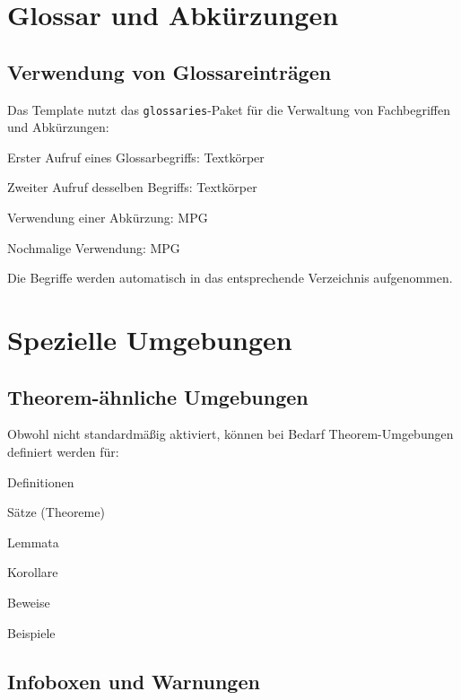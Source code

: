 \section{Glossar und Abkürzungen}
\label{sec:glossar_demo}

\subsection{Verwendung von Glossareinträgen}
\label{subsec:glossar_verwendung}

Das Template nutzt das \texttt{glossaries}-Paket für die Verwaltung von Fachbegriffen und Abkürzungen:
\begin{listenabsatz}
	\item Erster Aufruf eines Glossarbegriffs: \gls{Textkörper}
	\item Zweiter Aufruf desselben Begriffs: \gls{Textkörper}
	\item Verwendung einer Abkürzung: \gls{MPG}
	\item Nochmalige Verwendung: \gls{MPG}
\end{listenabsatz}

Die Begriffe werden automatisch in das entsprechende Verzeichnis aufgenommen.

\section{Spezielle Umgebungen}
\label{sec:spezielle_umgebungen}

\subsection{Theorem-ähnliche Umgebungen}
\label{subsec:theoreme}

Obwohl nicht standardmäßig aktiviert, können bei Bedarf Theorem-Umgebungen definiert werden für:
\begin{listenabsatz}
	\item Definitionen
	\item Sätze (Theoreme)
	\item Lemmata
	\item Korollare
	\item Beweise
	\item Beispiele
\end{listenabsatz}

\subsection{Infoboxen und Warnungen}
\label{subsec:infoboxen}

